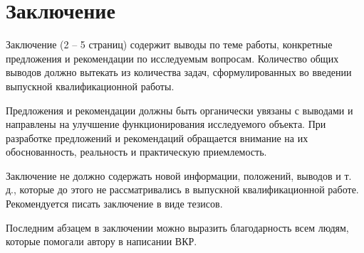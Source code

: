 \chapter*{Заключение} \label{ch-conclusion}

Заключение (2 -- 5 страниц) содержит выводы по теме работы, конкретные
предложения и рекомендации по исследуемым вопросам. Количество общих выводов
должно вытекать из количества задач, сформулированных во введении выпускной
квалификационной работы.

Предложения и рекомендации должны быть органически увязаны с выводами
и направлены на улучшение функционирования исследуемого объекта. При разработке
предложений и рекомендаций обращается внимание на их обоснованность,
реальность и практическую приемлемость.

Заключение не должно содержать новой информации, положений, выводов и
т. д., которые до этого не рассматривались в выпускной квалификационной работе.
Рекомендуется писать заключение в виде тезисов.

Последним абзацем в заключении можно выразить благодарность всем людям, которые помогали автору в написании ВКР.